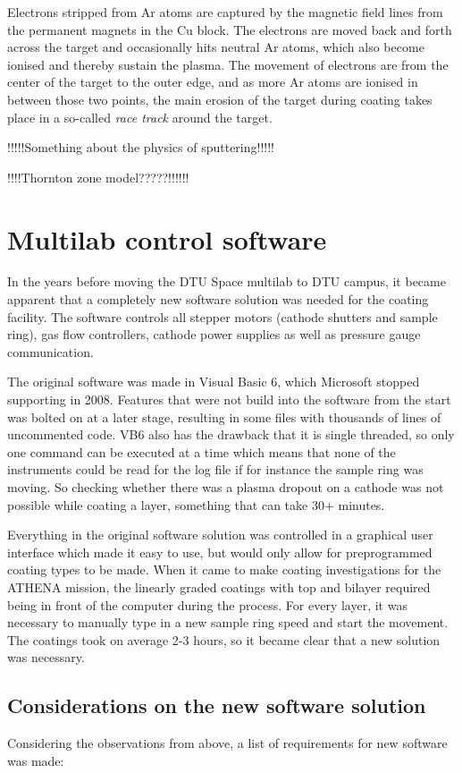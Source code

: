 Electrons stripped from Ar atoms are captured by the magnetic field lines from the permanent magnets in the Cu block. The electrons are moved back and forth across the target and occasionally hits neutral Ar atoms, which also become ionised and thereby sustain the plasma. The movement of electrons are from the center of the target to the outer edge, and as more Ar atoms are ionised in between those two points, the main erosion of the target during coating takes place in a so-called \emph{race track} around the target.

!!!!!Something about the physics of sputtering!!!!!

!!!!Thornton zone model?????!!!!!!

\section{Multilab control software}\label{sec:ml_software}
In the years before moving the DTU Space multilab to DTU campus, it became apparent that a completely new software solution was needed for the coating facility. The software controls all stepper motors (cathode shutters and sample ring), gas flow controllers,  cathode power supplies as well as pressure gauge communication.

The original software was made in Visual Basic 6, which Microsoft stopped supporting in 2008. Features that were not build into the software from the start was bolted on at a later stage, resulting in some files with thousands of lines of uncommented code. VB6 also has the drawback that it is single threaded, so only one command can be executed at a time which means that none of the instruments could be read for the log file if for instance the sample ring was moving. So checking whether there was a plasma dropout on a cathode was not possible while coating a layer, something that can take 30+ minutes.

Everything in the original software solution was controlled in a graphical user interface which made it easy to use, but would only allow for preprogrammed coating types to be made. When it came to make coating investigations for the ATHENA mission, the linearly graded coatings with top and bilayer required being in front of the computer during the process. For every layer, it was necessary to manually type in a new sample ring speed and start the movement. The coatings took on average 2-3 hours, so it became clear that a new solution was necessary.

\subsection{Considerations on the new software solution}
Considering the observations from above, a list of requirements for new software was made:

